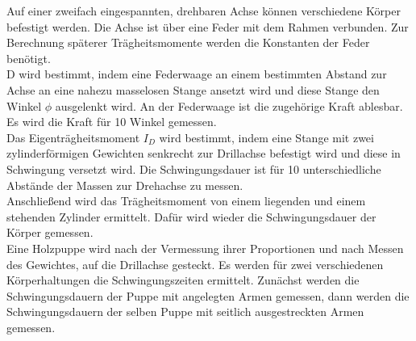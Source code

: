 Auf einer zweifach eingespannten, drehbaren Achse können verschiedene Körper befestigt werden.
Die Achse ist über eine Feder mit dem Rahmen verbunden.
Zur Berechnung späterer Trägheitsmomente werden die Konstanten der Feder benötigt.
\\D wird bestimmt, indem eine Federwaage an einem bestimmten Abstand zur Achse an eine nahezu masselosen Stange ansetzt wird und diese Stange den Winkel $\phi$ ausgelenkt wird.
An der Federwaage ist die zugehörige Kraft ablesbar.
Es wird die Kraft für 10 Winkel gemessen.
\\Das Eigenträgheitsmoment $I_D$ wird bestimmt, indem eine Stange mit zwei zylinderförmigen Gewichten senkrecht zur Drillachse befestigt wird und diese in Schwingung versetzt wird.
Die Schwingungsdauer ist für 10 unterschiedliche Abstände der Massen zur Drehachse zu messen.
\\Anschließend wird das Trägheitsmoment von einem liegenden und einem stehenden Zylinder ermittelt.
Dafür wird wieder die Schwingungsdauer der Körper gemessen.
\\Eine Holzpuppe wird nach der Vermessung ihrer Proportionen und nach Messen des Gewichtes, auf die Drillachse gesteckt.
Es werden für zwei verschiedenen Körperhaltungen die Schwingungszeiten ermittelt.
Zunächst werden die Schwingungsdauern der Puppe mit angelegten Armen gemessen, dann werden die Schwingungsdauern der selben Puppe mit seitlich ausgestreckten Armen gemessen.
